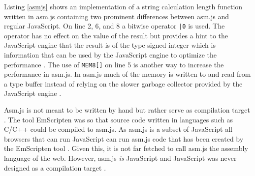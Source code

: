 

Listing \ref{asmjs} shows an implementation of a string calculation length function written in asm.js containing two prominent differences between asm.js and regular JavaScript. On line 2, 6, and 8 a bitwise operator \texttt{|0} is used. The operator has no effect on the value of the result but provides a hint to the JavaScript engine that the result is of the type signed integer which is information that can be used by the JavaScript engine to optimize the performance \parencite{Zakai2018}. The use of \texttt{MEM8[]} on line 5 is another way to increase the performance in asm.js. In asm.js much of the memory is written to and read from a type buffer instead of relying on the slower garbage collector provided by the JavaScript engine \parencite{Zakai2011}.

Asm.js is not meant to be written by hand but rather serve as compilation target \parencite{VanEsNicolayStievenartDHondtDeRoover2016}. The tool EmScripten \parencite{Zakai2011} was so that source code written in languages such as C/C++ could be compiled to asm.js. As asm.js is a subset of JavaScript all browsers that can run JavaScript can run asm.js code that has been created by the EmScripten tool \parencite{HaasRossbergSchuffTitzerHolmanGohmanWagnerZakaiBastien2017}. Given this, it is not far fetched to call asm.js the assembly language of the web. However, asm.js \emph{is} JavaScript and JavaScript was never designed as a compilation target \parencite{Watt2018}.
